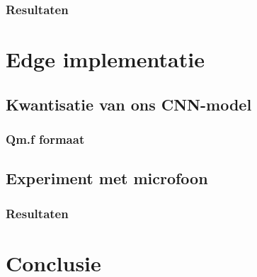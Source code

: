 \subsubsection{Resultaten}


\section{Edge implementatie}

\subsection{Kwantisatie van ons CNN-model}
\subsubsection{Qm.f formaat}
\label{section:Qm.f}

\subsection{Experiment met microfoon}
\subsubsection{Resultaten}


\section{Conclusie}